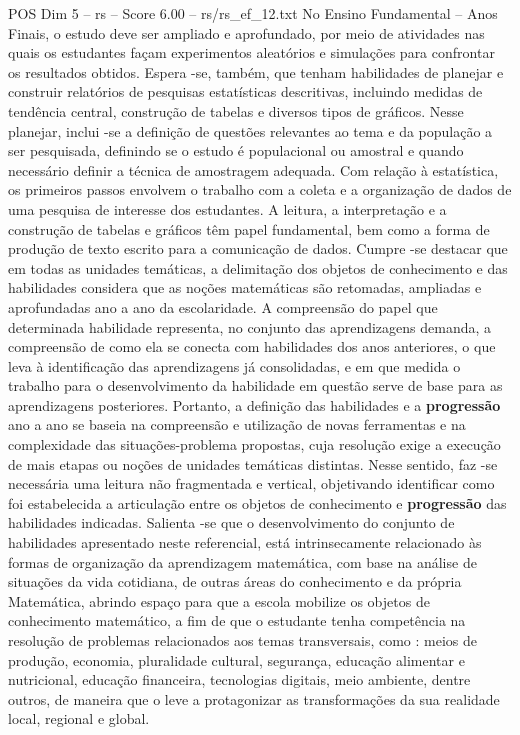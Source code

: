 \begin{textsample}{POS Dim 5 – rs – Score 6.00 – rs/rs\_ef\_12.txt}
No Ensino Fundamental – Anos Finais, o estudo deve ser ampliado e aprofundado, por meio de atividades nas quais os estudantes façam experimentos aleatórios e simulações para confrontar os resultados obtidos.
Espera -se, também, que tenham habilidades de planejar e construir relatórios de pesquisas estatísticas descritivas, incluindo medidas de tendência central, construção de tabelas e diversos tipos de gráficos.
Nesse planejar, inclui -se a definição de questões relevantes ao tema e da população a ser pesquisada, definindo se o estudo é populacional ou amostral e quando necessário definir a técnica de amostragem adequada.
Com relação à estatística, os primeiros passos envolvem o trabalho com a coleta e a organização de dados de uma pesquisa de interesse dos estudantes.
A leitura, a interpretação e a construção de tabelas e gráficos têm papel fundamental, bem como a forma de produção de texto escrito para a comunicação de dados.
Cumpre -se destacar que em todas as unidades temáticas, a delimitação dos objetos de conhecimento e das habilidades considera que as noções matemáticas são retomadas, ampliadas e aprofundadas ano a ano da escolaridade.
A compreensão do papel que determinada habilidade representa, no conjunto das aprendizagens demanda, a compreensão de como ela se conecta com habilidades dos anos anteriores, o que leva à identificação das aprendizagens já consolidadas, e em que medida o trabalho para o desenvolvimento da habilidade em questão serve de base para as aprendizagens posteriores.
Portanto, a definição das habilidades e a \textbf{progressão} ano a ano se baseia na compreensão e utilização de novas ferramentas e na complexidade das situações-problema propostas, cuja resolução exige a execução de mais etapas ou noções de unidades temáticas distintas.
Nesse sentido, faz -se necessária uma leitura não fragmentada e vertical, objetivando identificar como foi estabelecida a articulação entre os objetos de conhecimento e \textbf{progressão} das habilidades indicadas.
Salienta -se que o desenvolvimento do conjunto de habilidades apresentado neste referencial, está intrinsecamente relacionado às formas de organização da aprendizagem matemática, com base na análise de situações da vida cotidiana, de outras áreas do conhecimento e da própria Matemática, abrindo espaço para que a escola mobilize os objetos de conhecimento matemático, a fim de que o estudante tenha competência na resolução de problemas relacionados aos temas transversais, como : meios de produção, economia, pluralidade cultural, segurança, educação alimentar e nutricional, educação financeira, tecnologias digitais, meio ambiente, dentre outros, de maneira que o leve a protagonizar as transformações da sua realidade local, regional e global.

\end{textsample}

